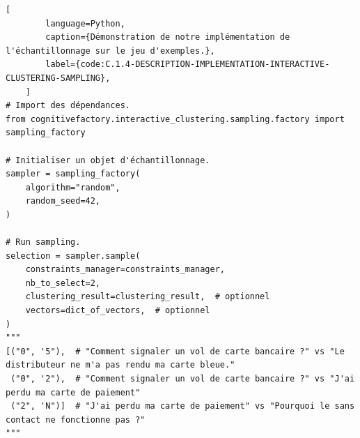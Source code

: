 	\begin{lstlisting}[
		language=Python,
		caption={Démonstration de notre implémentation de l'échantillonnage sur le jeu d'exemples.},
		label={code:C.1.4-DESCRIPTION-IMPLEMENTATION-INTERACTIVE-CLUSTERING-SAMPLING},
	]
# Import des dépendances.
from cognitivefactory.interactive_clustering.sampling.factory import sampling_factory

# Initialiser un objet d'échantillonnage.
sampler = sampling_factory(
	algorithm="random",
	random_seed=42,
)

# Run sampling.
selection = sampler.sample(
	constraints_manager=constraints_manager,
	nb_to_select=2,
	clustering_result=clustering_result,  # optionnel
	vectors=dict_of_vectors,  # optionnel
)
"""
[("0", '5"),  # "Comment signaler un vol de carte bancaire ?" vs "Le distributeur ne m'a pas rendu ma carte bleue."
 ("0", '2"),  # "Comment signaler un vol de carte bancaire ?" vs "J'ai perdu ma carte de paiement"
 ("2", 'N")]  # "J'ai perdu ma carte de paiement" vs "Pourquoi le sans contact ne fonctionne pas ?"
"""
	\end{lstlisting}